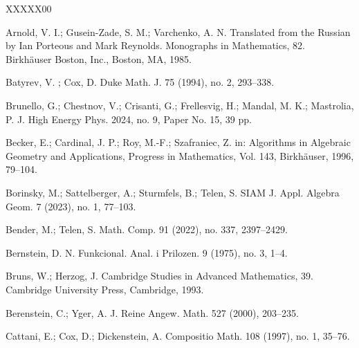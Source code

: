\documentclass[a4paper,11pt]{amsart}
\newcounter{thm}
\numberwithin{thm}{section}
\numberwithin{equation}{section}
\theoremstyle{definition}
\theoremstyle{plain}
\begin{document}
\bigskip
\begin{thebibliography}{XXXXX00}

Arnold, V. I.; Gusein-Zade, S. M.; Varchenko, A. N. 
\newblock  Translated from the Russian by Ian Porteous and Mark Reynolds. 
\newblock Monographs in Mathematics, 82. Birkh\"auser Boston, Inc., Boston, MA, 1985.

Batyrev, V. ; Cox, D.
\newblock Duke Math. J. 75 (1994), no. 2, 293--338. 

Brunello, G.; Chestnov, V.; Crisanti, G.; Frellesvig, H.; Mandal, M. K.; Mastrolia, P.
\newblock J. High Energy Phys. 2024, no. 9, Paper No. 15, 39 pp. 

Becker, E.; Cardinal, J. P.; Roy, M.-F.;  Szafraniec, Z.
\newblock in:  Algorithms in Algebraic Geometry and Applications, Progress in Mathematics, Vol. 143, Birkh\"auser, 1996, 
79--104.

Borinsky, M.; Sattelberger, A.; Sturmfels, B.; Telen, S.
\newblock SIAM J. Appl. Algebra Geom. 7 (2023), no. 1, 77--103. 

Bender, M.; Telen, S.
\newblock Math. Comp. 91 (2022), no. 337, 2397--2429.

Bernstein, D. N. 
 Funkcional. Anal. i Prilozen. 9 (1975), no. 3, 1--4.


Bruns, W.; Herzog, J.
\newblock Cambridge Studies in Advanced Mathematics, 39. Cambridge University Press, Cambridge, 1993. 

Berenstein, C.; Yger, A.
\newblock J. Reine Angew. Math. 527 (2000), 203--235.


Cattani, E.; Cox, D.; Dickenstein, A.
\newblock Compositio Math. 108 (1997), no. 1, 35--76.



\end{thebibliography}
\end{document}

